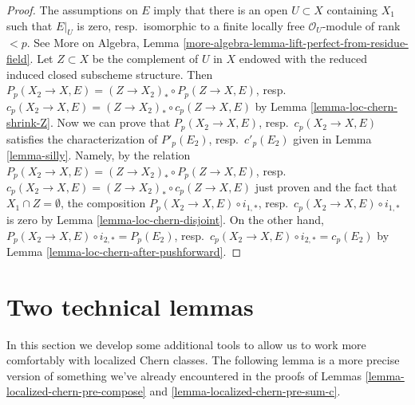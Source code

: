 \begin{proof}
The assumptions on $E$ imply that there is an open $U \subset X$
containing $X_1$ such that $E|_U$ is zero, resp.\ isomorphic to a finite locally
free $\mathcal{O}_U$-module of rank $< p$. See More on Algebra, Lemma
\ref{more-algebra-lemma-lift-perfect-from-residue-field}.
Let $Z \subset X$ be the complement of $U$ in $X$ endowed with
the reduced induced closed subscheme structure. Then
$P_p(X_2 \to X, E) = (Z \to X_2)_* \circ P_p(Z \to X, E)$,
resp.\ $c_p(X_2 \to X, E) = (Z \to X_2)_* \circ c_p(Z \to X, E)$
by Lemma \ref{lemma-loc-chern-shrink-Z}.
Now we can prove that $P_p(X_2 \to X, E)$, resp.\ $c_p(X_2 \to X, E)$
satisfies the characterization of $P'_p(E_2)$, resp.\ $c'_p(E_2)$
given in Lemma \ref{lemma-silly}. Namely, by the relation
$P_p(X_2 \to X, E) = (Z \to X_2)_* \circ P_p(Z \to X, E)$,
resp.\ $c_p(X_2 \to X, E) = (Z \to X_2)_* \circ c_p(Z \to X, E)$
just proven and the fact that $X_1 \cap Z = \emptyset$,
the composition $P_p(X_2 \to X, E) \circ i_{1, *}$,
resp.\ $c_p(X_2 \to X, E) \circ i_{1, *}$ is zero
by Lemma \ref{lemma-loc-chern-disjoint}.
On the other hand,
$P_p(X_2 \to X, E) \circ i_{2, *} = P_p(E_2)$,
resp.\ $c_p(X_2 \to X, E) \circ i_{2, *} = c_p(E_2)$
by Lemma \ref{lemma-loc-chern-after-pushforward}.
\end{proof}





\section{Two technical lemmas}
\label{section-tools-loc-chern}

\noindent
In this section we develop some additional tools to allow us to work
more comfortably with localized Chern classes. The following lemma
is a more precise version of something we've already encountered in
the proofs of Lemmas \ref{lemma-localized-chern-pre-compose} and
\ref{lemma-localized-chern-pre-sum-c}.

